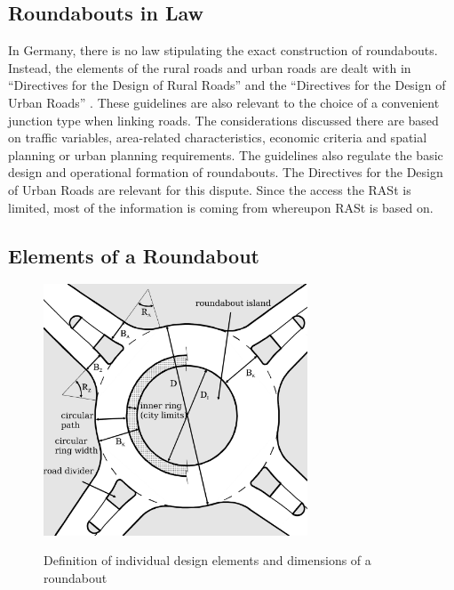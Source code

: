 \subsection{Roundabouts in Law}
%
In Germany, there is no law stipulating the exact construction of roundabouts.
Instead, the elements of the rural roads and urban roads are dealt with in ``Directives for the Design of Rural Roads'' \cite{ral13}
and the ``Directives for the Design of Urban Roads''  \cite{rast06}. These guidelines are also relevant to the choice of a convenient junction type when linking roads.
The considerations discussed there are based on traffic variables, area-related characteristics, economic criteria and spatial planning or urban planning requirements. 
The guidelines also regulate the basic design and operational formation of roundabouts.
The  Directives for the Design of Urban Roads \cite{rast06} are relevant for this dispute. Since the access the RASt is limited, most of the information is coming from
\cite{man06} whereupon RASt is based on.
\subsection{Elements of a Roundabout}

\begin{figure}[!ht]
\caption{Definition of individual design elements and dimensions of a roundabout \cite{man06}}
\includegraphics[width=0.7\textwidth]{bilder/kreisverkehr.png} %
\label{roundabout_parts}
\end{figure}


